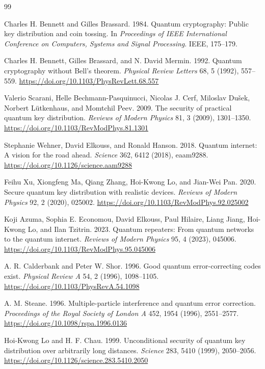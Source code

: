 \documentclass[conference,compsoc]{IEEEtran}
\begin{document}
\begingroup
\sloppy
{}
\begin{thebibliography}{99}


Charles H. Bennett and Gilles Brassard.
1984.
Quantum cryptography: Public key distribution and coin tossing.
In \emph{Proceedings of IEEE International Conference on Computers, Systems and Signal Processing}. IEEE, 175--179.

Charles H. Bennett, Gilles Brassard, and N. David Mermin.
1992.
Quantum cryptography without Bell's theorem.
\emph{Physical Review Letters} 68, 5 (1992), 557--559.
\url{https://doi.org/10.1103/PhysRevLett.68.557}

Valerio Scarani, Helle Bechmann-Pasquinucci, Nicolas J. Cerf, Miloslav Du\v{s}ek, Norbert L\"utkenhaus, and Momtchil Peev.
2009.
The security of practical quantum key distribution.
\emph{Reviews of Modern Physics} 81, 3 (2009), 1301--1350.
\url{https://doi.org/10.1103/RevModPhys.81.1301}

Stephanie Wehner, David Elkouss, and Ronald Hanson.
2018.
Quantum internet: A vision for the road ahead.
\emph{Science} 362, 6412 (2018), eaam9288.
\url{https://doi.org/10.1126/science.aam9288}

Feihu Xu, Xiongfeng Ma, Qiang Zhang, Hoi-Kwong Lo, and Jian-Wei Pan.
2020.
Secure quantum key distribution with realistic devices.
\emph{Reviews of Modern Physics} 92, 2 (2020), 025002.
\url{https://doi.org/10.1103/RevModPhys.92.025002}

Koji Azuma, Sophia E. Economou, David Elkouss, Paul Hilaire, Liang Jiang, Hoi-Kwong Lo, and Ilan Tzitrin.
2023.
Quantum repeaters: From quantum networks to the quantum internet.
\emph{Reviews of Modern Physics} 95, 4 (2023), 045006.
\url{https://doi.org/10.1103/RevModPhys.95.045006}

A. R. Calderbank and Peter W. Shor.
1996.
Good quantum error-correcting codes exist.
\emph{Physical Review A} 54, 2 (1996), 1098--1105.
\url{https://doi.org/10.1103/PhysRevA.54.1098}

A. M. Steane.
1996.
Multiple-particle interference and quantum error correction.
\emph{Proceedings of the Royal Society of London A} 452, 1954 (1996), 2551--2577.
\url{https://doi.org/10.1098/rspa.1996.0136}

Hoi-Kwong Lo and H. F. Chau.
1999.
Unconditional security of quantum key distribution over arbitrarily long distances.
\emph{Science} 283, 5410 (1999), 2050--2056.
\url{https://doi.org/10.1126/science.283.5410.2050}


\end{thebibliography}
\end{document}
